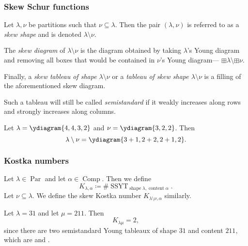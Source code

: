 \documentclass{article}
\DeclareMathOperator{\shape}{shape}
\DeclareMathOperator{\content}{content}
\DeclareMathOperator{\Par}{Par}
\DeclareMathOperator{\Com}{Comp}
\DeclareMathOperator{\SSYT}{SSYT}
\begin{document}
\subsubsection{Skew Schur functions}
\begin{definition}
    Let $\lambda, \nu$ be partitions such that $\nu \subseteq \lambda$. Then the pair $(\lambda, \nu)$ is referred to as a \textit{skew shape} and is denoted $\lambda \setminus \nu$.

    The \textit{skew diagram} of $\lambda \setminus \nu$ is the diagram obtained by taking $\lambda$'s Young diagram and removing all boxes that would be contained in $\nu$'s Young diagram--- $\boxplus \lambda \setminus \boxplus \nu$.

    Finally, a \textit{skew tableau of shape $\lambda \setminus \nu$} or a \textit{tableau of skew shape $\lambda \setminus \nu$} is a filling of the aforementioned skew diagram. 

    Such a tableau will still be called \textit{semistandard} if it weakly increases along rows and strongly increases along columns.
\end{definition}

\begin{example} 
    \ytabsmallbox
    Let $\lambda = \ydiagram{4,4,3,2}$ and $\nu = \ydiagram{3,2,2}$.
    Then 
    \ytabnormalbox
    \[\lambda \setminus \nu = \ydiagram{3+1,2+2,2+1,2}.\]
\end{example}

\subsubsection{Kostka numbers}

\begin{definition}
    Let $\lambda \in \Par$ and let $\alpha \in \Com$.
    Then we define
    \[
        K_{\lambda,\alpha} \coloneq \#\SSYT_{\shape \lambda, \content \alpha}.
    \]
    Let $\nu \subseteq \lambda$. We define the skew Kostka number $K_{\lambda\setminus\nu,\alpha}$ similarly.
\end{definition}

\begin{example}
    Let $\lambda = 31$ and let $\mu = 211$.
    Then
    \[
        K_{\lambda\mu} = 2,
    \]
    since there are two semistandard Young tableaux of shape $31$ and content $211$, which are \ytabsmallbox{} and .
\end{example}
\end{document}
